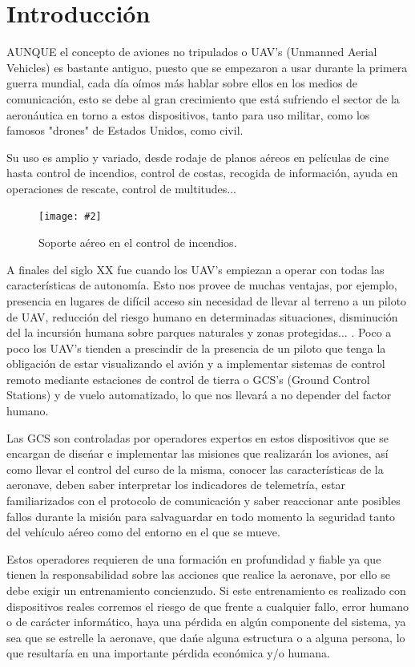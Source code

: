 \documentclass[12pt,a4paper,spanish]{book} %
\newcommand{\imgCentrada}[3]{
\begin{figure}[H]
\begin{center}
\texttt{[image: \#2]}
\caption{#3}
\label{#1}
\end{center}
\end{figure}
}
\begin{document}
 

\chapter{Introducción}

\lettrine{A}{UNQUE} el concepto de aviones no tripulados o UAV's (Unmanned Aerial Vehicles) es bastante antiguo, puesto que se empezaron a usar durante la primera guerra mundial, cada día oímos más hablar sobre ellos en los medios de comunicación, esto se debe al gran crecimiento que está sufriendo el sector de la aeronáutica en torno a estos dispositivos, tanto para uso militar, como los famosos "drones" de Estados Unidos, como civil.

Su uso es amplio y variado, desde rodaje de planos aéreos en películas de cine hasta control de incendios, control de costas, recogida de información, ayuda en operaciones de rescate, control de multitudes...

\imgCentrada{fig.1.1}{img/incendio.eps}{Soporte aéreo en el control de incendios.}

A finales del siglo XX fue cuando los UAV's empiezan a operar con todas las características de autonomía. Esto nos provee de muchas ventajas, por ejemplo, presencia en lugares de difícil acceso sin necesidad de llevar al terreno a un piloto de UAV, reducción del riesgo humano en determinadas situaciones, disminución del la incursión humana sobre parques naturales y zonas protegidas... . Poco a poco los UAV's tienden a prescindir de la presencia de un piloto que tenga la obligación de estar visualizando el avión y a implementar sistemas de control remoto mediante estaciones de control de tierra o GCS's (Ground Control Stations) y de vuelo automatizado, lo que nos llevará a no depender del factor humano. 

Las GCS son controladas por operadores expertos en estos dispositivos que se encargan de dise\'nar e implementar las misiones que realizarán los aviones, así como llevar el control del curso de la misma, conocer las características de la aeronave, deben saber interpretar los indicadores de telemetría, estar familiarizados con el protocolo de comunicación y saber reaccionar ante posibles fallos durante la misión para salvaguardar en todo momento la seguridad tanto del vehículo aéreo como del entorno en el que se mueve.

Estos operadores requieren de una formación en profundidad y fiable ya que tienen la responsabilidad sobre las acciones que realice la aeronave, por ello se debe exigir un entrenamiento concienzudo. Si este entrenamiento es realizado con dispositivos reales corremos el riesgo de que frente a cualquier fallo, error humano o de carácter informático, haya una pérdida en algún componente del sistema, ya sea que se estrelle la aeronave, que da\'ne alguna estructura o a alguna persona, lo que resultaría en una importante pérdida económica y/o humana. 
\end{document}
